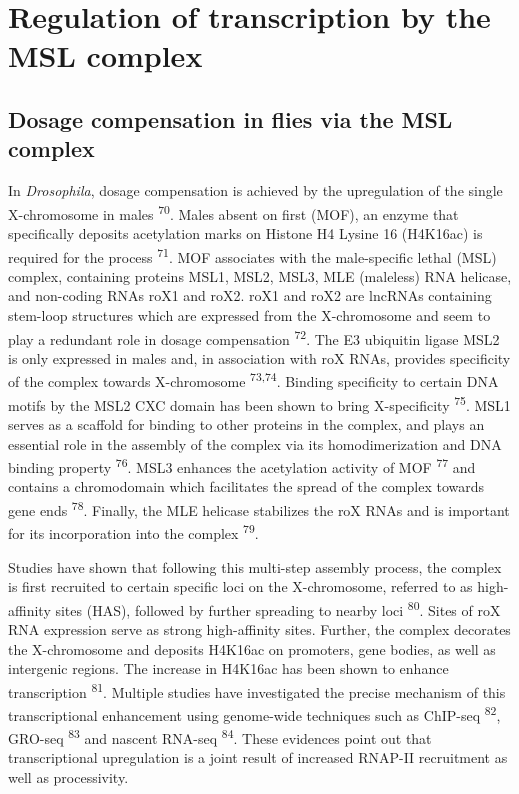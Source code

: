 \documentclass[11pt,twoside]{MPIthesis}
\theoremstyle{definition}
\theoremstyle{definition}
\theoremstyle{definition}
\theoremstyle{remark}
\begin{document}
\section{Regulation of transcription by the MSL
complex}\label{regulation-of-transcription-by-the-msl-complex}

\subsection{Dosage compensation in flies via the MSL
complex}\label{dosage-compensation-in-flies-via-the-msl-complex}

In \emph{Drosophila}, dosage compensation is achieved by the
upregulation of the single X-chromosome in males \textsuperscript{70}.
Males absent on first (MOF), an enzyme that specifically deposits
acetylation marks on Histone H4 Lysine 16 (H4K16ac) is required for the
process \textsuperscript{71}. MOF associates with the male-specific
lethal (MSL) complex, containing proteins MSL1, MSL2, MSL3, MLE
(maleless) RNA helicase, and non-coding RNAs roX1 and roX2. roX1 and
roX2 are lncRNAs containing stem-loop structures which are expressed
from the X-chromosome and seem to play a redundant role in dosage
compensation \textsuperscript{72}. The E3 ubiquitin ligase MSL2 is only
expressed in males and, in association with roX RNAs, provides
specificity of the complex towards X-chromosome \textsuperscript{73,74}.
Binding specificity to certain DNA motifs by the MSL2 CXC domain has
been shown to bring X-specificity \textsuperscript{75}. MSL1 serves as a
scaffold for binding to other proteins in the complex, and plays an
essential role in the assembly of the complex via its homodimerization
and DNA binding property \textsuperscript{76}. MSL3 enhances the
acetylation activity of MOF \textsuperscript{77} and contains a
chromodomain which facilitates the spread of the complex towards gene
ends \textsuperscript{78}. Finally, the MLE helicase stabilizes the roX
RNAs and is important for its incorporation into the complex
\textsuperscript{79}.

Studies have shown that following this multi-step assembly process, the
complex is first recruited to certain specific loci on the X-chromosome,
referred to as high-affinity sites (HAS), followed by further spreading
to nearby loci \textsuperscript{80}. Sites of roX RNA expression serve
as strong high-affinity sites. Further, the complex decorates the
X-chromosome and deposits H4K16ac on promoters, gene bodies, as well as
intergenic regions. The increase in H4K16ac has been shown to enhance
transcription \textsuperscript{81}. Multiple studies have investigated
the precise mechanism of this transcriptional enhancement using
genome-wide techniques such as ChIP-seq \textsuperscript{82}, GRO-seq
\textsuperscript{83} and nascent RNA-seq \textsuperscript{84}. These
evidences point out that transcriptional upregulation is a joint result
of increased RNAP-II recruitment as well as processivity.
\end{document}
